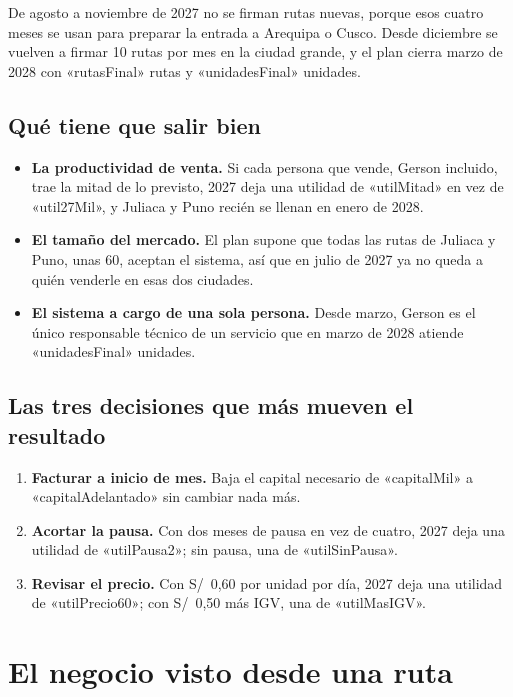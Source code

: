 \documentclass[10.5pt,a4paper]{article}
\begin{document}
De agosto a noviembre de 2027 no se firman rutas nuevas, porque esos cuatro meses se usan para preparar la entrada a Arequipa o Cusco. Desde diciembre se vuelven a firmar 10 rutas por mes en la ciudad grande, y el plan cierra marzo de 2028 con «rutasFinal» rutas y «unidadesFinal» unidades.

\subsection{Qué tiene que salir bien}

\begin{itemize}
\item \textbf{La productividad de venta.} Si cada persona que vende, Gerson incluido, trae la mitad de lo previsto, 2027 deja una utilidad de «utilMitad» en vez de «util27Mil», y Juliaca y Puno recién se llenan en enero de 2028.
\item \textbf{El tamaño del mercado.} El plan supone que todas las rutas de Juliaca y Puno, unas 60, aceptan el sistema, así que en julio de 2027 ya no queda a quién venderle en esas dos ciudades.
\item \textbf{El sistema a cargo de una sola persona.} Desde marzo, Gerson es el único responsable técnico de un servicio que en marzo de 2028 atiende «unidadesFinal» unidades.
\end{itemize}

\subsection{Las tres decisiones que más mueven el resultado}

\begin{enumerate}
\item \textbf{Facturar a inicio de mes.} Baja el capital necesario de «capitalMil» a «capitalAdelantado» sin cambiar nada más.
\item \textbf{Acortar la pausa.} Con dos meses de pausa en vez de cuatro, 2027 deja una utilidad de «utilPausa2»; sin pausa, una de «utilSinPausa».
\item \textbf{Revisar el precio.} Con S/~0,60 por unidad por día, 2027 deja una utilidad de «utilPrecio60»; con S/~0,50 más IGV, una de «utilMasIGV».
\end{enumerate}

\section{El negocio visto desde una ruta}
\end{document}
